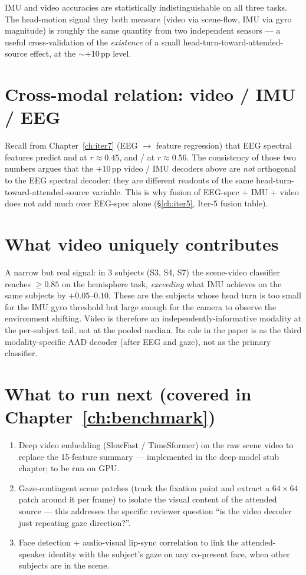 IMU and video accuracies are statistically indistinguishable on all
three tasks. The head-motion signal they both measure (video via
scene-flow, IMU via gyro magnitude) is roughly the same quantity from
two independent sensors --- a useful cross-validation of the
\emph{existence} of a small head-turn-toward-attended-source effect,
at the $\sim +10$\,pp level.

\section{Cross-modal relation: video / IMU / EEG}

Recall from Chapter~\ref{ch:iter7} (EEG $\rightarrow$ feature
regression) that EEG spectral features predict
 and  at
$r \approx 0.45$, and  /
 at $r \approx 0.56$. The consistency of those
two numbers argues that the $+10$\,pp video / IMU decoders above are
\emph{not} orthogonal to the EEG spectral decoder: they are
different readouts of the same head-turn-toward-attended-source
variable. This is why fusion of EEG-spec $+$ IMU $+$ video does not
add much over EEG-spec alone (§\ref{ch:iter5}, Iter-5 fusion table).

\section{What video uniquely contributes}

A narrow but real signal: in 3 subjects (S3, S4, S7) the scene-video
classifier reaches $\geq 0.85$ on the hemisphere task, \emph{exceeding}
what IMU achieves on the same subjects by $+0.05$--$0.10$. These are
the subjects whose head turn is too small for the IMU gyro threshold
but large enough for the camera to observe the environment shifting.
Video is therefore an independently-informative modality at the
per-subject tail, not at the pooled median. Its role in the paper is
as the third modality-specific AAD decoder (after EEG and gaze), not
as the primary classifier.

\section{What to run next (covered in Chapter~\ref{ch:benchmark})}

\begin{enumerate}
  \item Deep video embedding (SlowFast / TimeSformer) on the raw scene
        video to replace the 15-feature summary — implemented in the
        deep-model stub chapter; to be run on GPU.
  \item Gaze-contingent scene patches (track the fixation point and
        extract a $64 \times 64$ patch around it per frame) to isolate
        the visual content of the attended source — this addresses the
        specific reviewer question ``is the video decoder just
        repeating gaze direction?''.
  \item Face detection + audio-visual lip-sync correlation to link the
        attended-speaker identity with the subject's gaze on any
        co-present face, when other subjects are in the scene.
\end{enumerate}
